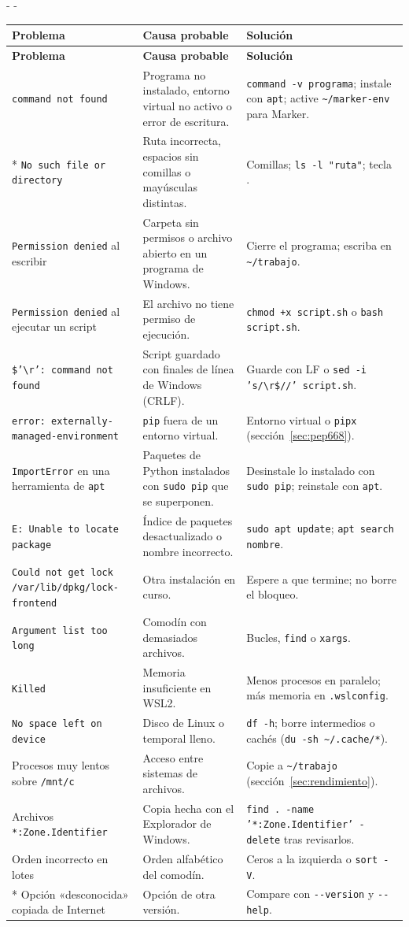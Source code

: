 \documentclass[11pt,a4paper]{article}
\makeatletter
\newcommand{\necesitaespacio}[1]{\par\penalty-100\begingroup
	\setlength{\dimen@}{#1}\dimen@ii\pagegoal\advance\dimen@ii-\pagetotal
	\ifdim\dimen@>\dimen@ii\ifdim\dimen@ii>\z@\vfil\fi\penalty-\@M\fi\endgroup}
\newenvironment{errores}{%
	\par\begingroup\small
	\begin{longtable}{L{4.1cm}L{4.9cm}L{6.0cm}}
		\toprule\rowcolor{tablacab}\cab{Problema} & \cab{Causa probable} & \cab{Solución} \\ \midrule
		\endfirsthead
		\toprule\rowcolor{tablacab}\cab{Problema} & \cab{Causa probable} & \cab{Solución} \\ \midrule
		\endhead
		\bottomrule
		\endfoot}
	{\end{longtable}\endgroup}
\newcommand{\cmd}[1]{\texttt{\textcolor{colcmd}{#1}}}      %
\newcommand{\arch}[1]{\texttt{\textcolor{colarch}{#1}}}    %
\newcommand{\tecla}[1]{\tcbox[on line, boxsep=0pt, left=3pt, right=3pt,
	top=1.5pt, bottom=1.5pt, colback=white, colframe=codigoborde,
	boxrule=0.5pt, arc=2pt]{\footnotesize\sffamily #1}}
\newcommand{\cab}[1]{\textbf{#1}}
\newcommand{\bs}{\textbackslash{}}    %
\newcommand{\tl}{\textasciitilde{}}  %
\makeatother
\begin{document}
	\necesitaespacio{10\baselineskip}
	\begin{errores}
		\texttt{command not found} & Programa no instalado, entorno virtual no activo o error de escritura. & \cmd{command -v programa}; instale con \cmd{apt}; active \arch{\tl/marker-env} para Marker.\\*
		\texttt{No such file or directory} & Ruta incorrecta, espacios sin comillas o mayúsculas distintas. & Comillas; \cmd{ls -l "ruta"}; tecla \tecla{Tab}.\\
		\texttt{Permission denied} al escribir & Carpeta sin permisos o archivo abierto en un programa de Windows. & Cierre el programa; escriba en \arch{\tl/trabajo}.\\
		\texttt{Permission denied} al ejecutar un script & El archivo no tiene permiso de ejecución. & \cmd{chmod +x script.sh} o \cmd{bash script.sh}.\\
		\texttt{\$'\bs{}\allowbreak{}r': command not found} & Script guardado con finales de línea de Windows (CRLF). & Guarde con LF o \cmd{sed -i 's/\allowbreak{}\bs{}\allowbreak{}r\$/\allowbreak{}/\allowbreak{}' script.sh}.\\
		\texttt{error: externally-\allowbreak{}managed-\allowbreak{}environment} & \cmd{pip} fuera de un entorno virtual. & Entorno virtual o \cmd{pipx} (sección~\ref{sec:pep668}).\\
		\texttt{ImportError} en una herramienta de \cmd{apt} & Paquetes de Python instalados con \cmd{sudo pip} que se superponen. & Desinstale lo instalado con \cmd{sudo pip}; reinstale con \cmd{apt}.\\
		\texttt{E: Unable to locate package} & Índice de paquetes desactualizado o nombre incorrecto. & \cmd{sudo apt update}; \cmd{apt search nombre}.\\
		\texttt{Could not get lock /\allowbreak{}var/\allowbreak{}lib/\allowbreak{}dpkg/\allowbreak{}lock-\allowbreak{}frontend} & Otra instalación en curso. & Espere a que termine; no borre el bloqueo.\\
		\texttt{Argument list too long} & Comodín con demasiados archivos. & Bucles, \cmd{find} o \cmd{xargs}.\\
		\texttt{Killed} & Memoria insuficiente en WSL2. & Menos procesos en paralelo; más memoria en \arch{.wslconfig}.\\
		\texttt{No space left on device} & Disco de Linux o temporal lleno. & \cmd{df -h}; borre intermedios o cachés (\cmd{du -sh \tl/\allowbreak{}.cache/\allowbreak{}*}).\\
		Procesos muy lentos sobre \arch{/mnt/c} & Acceso entre sistemas de archivos. & Copie a \arch{\tl/trabajo} (sección~\ref{sec:rendimiento}).\\
		Archivos \arch{*:Zone.Identifier} & Copia hecha con el Explorador de Windows. & \cmd{find . -name '*:Zone.Identifier' -delete} tras revisarlos.\\
		Orden incorrecto en lotes & Orden alfabético del comodín. & Ceros a la izquierda o \cmd{sort -V}.\\*
		Opción «desconocida» copiada de Internet & Opción de otra versión. & Compare con \cmd{-{}-version} y \cmd{-{}-help}.\\
	\end{errores}
	
\end{document}
